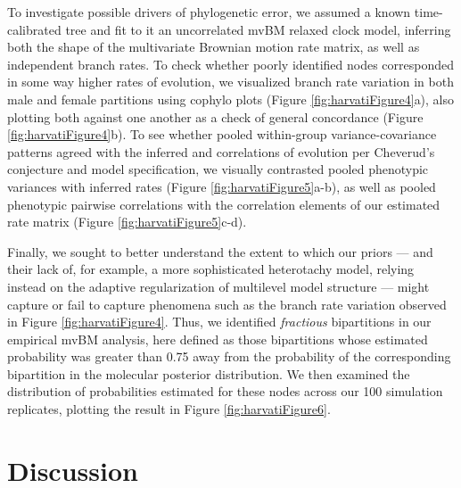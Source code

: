 To investigate possible drivers of phylogenetic error, we assumed a known time-calibrated tree and fit to it an uncorrelated mvBM relaxed clock model, inferring both the shape of the multivariate Brownian motion rate matrix, as well as independent branch rates. To check whether poorly identified nodes corresponded in some way higher rates of evolution, we visualized branch rate variation in both male and female partitions using cophylo plots (Figure \ref{fig:harvatiFigure4}a), also plotting both against one another as a check of general concordance (Figure \ref{fig:harvatiFigure4}b). To see whether pooled within-group variance-covariance patterns agreed with the inferred and correlations of evolution per Cheverud's conjecture and model specification, we visually contrasted pooled phenotypic variances with inferred rates (Figure \ref{fig:harvatiFigure5}a-b), as well as pooled phenotypic pairwise correlations with the correlation elements of our estimated rate matrix (Figure \ref{fig:harvatiFigure5}c-d).

Finally, we sought to better understand the extent to which our priors --- and their lack of, for example, a more sophisticated heterotachy model, relying instead on the adaptive regularization of multilevel model structure --- might capture or fail to capture phenomena such as the branch rate variation observed in Figure \ref{fig:harvatiFigure4}. Thus, we identified \textit{fractious} bipartitions in our empirical mvBM analysis, here defined as those bipartitions whose estimated probability was greater than 0.75 away from the probability of the corresponding bipartition in the molecular posterior distribution. We then examined the distribution of probabilities estimated for these nodes across our 100 simulation replicates, plotting the result in Figure \ref{fig:harvatiFigure6}.

\clearpage

\section{Discussion}

